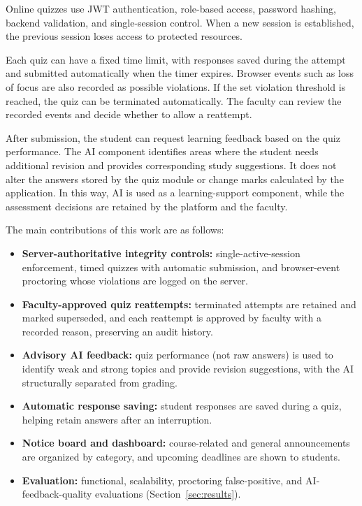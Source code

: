 \documentclass[conference]{IEEEtran}
\begin{document}
Online quizzes use JWT authentication, role-based access, password hashing, backend validation, and single-session control. When a new session is established, the previous session loses access to protected resources.

Each quiz can have a fixed time limit, with responses saved during the attempt and submitted automatically when the timer expires. Browser events such as loss of focus are also recorded as possible violations. If the set violation threshold is reached, the quiz can be terminated automatically. The faculty can review the recorded events and decide whether to allow a reattempt.

After submission, the student can request learning feedback based on the quiz performance. The AI component identifies areas where the student needs additional revision and provides corresponding study suggestions. It does not alter the answers stored by the quiz module or change marks calculated by the application. In this way, AI is used as a learning-support component, while the assessment decisions are retained by the platform and the faculty.

The main contributions of this work are as follows:

\begin{itemize}
    \item \textbf{Server-authoritative integrity controls:} single-active-session enforcement, timed quizzes with automatic submission, and browser-event proctoring whose violations are logged on the server.
    \item \textbf{Faculty-approved quiz reattempts:} terminated attempts are retained and marked superseded, and each reattempt is approved by faculty with a recorded reason, preserving an audit history.
    \item \textbf{Advisory AI feedback:} quiz performance (not raw answers) is used to identify weak and strong topics and provide revision suggestions, with the AI structurally separated from grading.
    \item \textbf{Automatic response saving:} student responses are saved during a quiz, helping retain answers after an interruption.
    \item \textbf{Notice board and dashboard:} course-related and general announcements are organized by category, and upcoming deadlines are shown to students.
    \item \textbf{Evaluation:} functional, scalability, proctoring false-positive, and AI-feedback-quality evaluations (Section~\ref{sec:results}).
\end{itemize}
\end{document}

